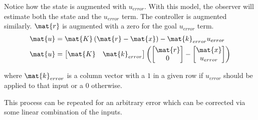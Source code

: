 Notice how the \gls{state} is augmented with $u_{error}$. With this \gls{model},
the \gls{observer} will estimate both the \gls{state} and the $u_{error}$ term.
The controller is augmented similarly. $\mat{r}$ is augmented with a zero for
the goal $u_{error}$ term.
\begin{align*}
  \mat{u} &= \mat{K} \left(\mat{r} - \mat{x}\right) - \mat{k}_{error}u_{error}
    \\
  \mat{u} &=
  \begin{bmatrix}
    \mat{K} & \mat{k}_{error}
  \end{bmatrix}
  \left(\begin{bmatrix}
    \mat{r} \\
    0
  \end{bmatrix} -
  \begin{bmatrix}
    \mat{x} \\
    u_{error}
  \end{bmatrix}\right)
\end{align*}

where $\mat{k}_{error}$ is a column vector with a $1$ in a given row if
$u_{error}$ should be applied to that \gls{input} or a $0$ otherwise.

This process can be repeated for an arbitrary \gls{error} which can be corrected
via some linear combination of the \glspl{input}.
